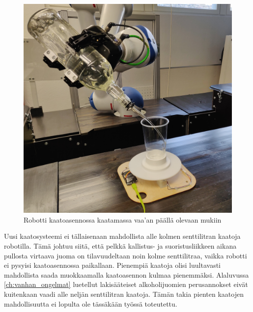 \begin{figure}[h]
\begin{center}
\includegraphics[scale=0.1]{img/kaato.jpg}
\end{center}
\caption{Robotti kaatoasennossa kaatamassa vaa'an päällä olevaan mukiin}
\label{fig:kaato}
\end{figure}

Uusi kaatosysteemi ei tällaisenaan mahdollista alle kolmen senttilitran kaatoja robotilla. Tämä johtuu siitä, että pelkkä kallistus- ja suoristusliikkeen aikana pullosta virtaava juoma on tilavuudeltaan noin kolme senttilitraa, vaikka robotti ei pysyisi kaatoasennossa paikallaan. Pienempiä kaatoja olisi luultavasti mahdollista saada muokkaamalla kaatoasennon kulmaa pienemmäksi. Alaluvussa \ref{ch:vanhan_ongelmat} luetellut lakisääteiset alkoholijuomien perusannokset eivät kuitenkaan vaadi alle neljän senttilitran kaatoja. Tämän takia pienten kaatojen mahdollisuutta ei lopulta ole tässäkään työssä toteutettu.
